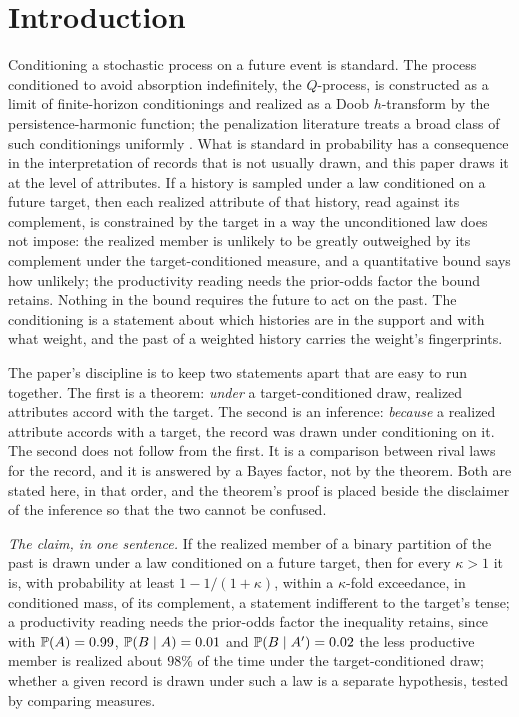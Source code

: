 \section{Introduction}\label{sec:intro}

Conditioning a stochastic process on a future event is standard. The
process conditioned to avoid absorption indefinitely, the $Q$-process, is
constructed as a limit of finite-horizon conditionings and realized as a
Doob $h$-transform by the persistence-harmonic function; the penalization
literature treats a broad class of such conditionings uniformly
\cite{RVY06,MV12,CV16}. What is standard in probability has a
consequence in the interpretation of records that is not usually drawn,
and this paper draws it at the level of attributes. If a history is
sampled under a law conditioned on a future target, then each realized
attribute of that history, read against its complement, is constrained by
the target in a way the unconditioned law does not impose: the realized member is unlikely to be greatly outweighed by its complement under the target-conditioned measure, and a quantitative bound says how unlikely; the productivity reading needs the prior-odds factor the bound retains. Nothing in the bound requires the
future to act on the past. The conditioning is a statement about which
histories are in the support and with what weight, and the past of a
weighted history carries the weight's fingerprints.

The paper's discipline is to keep two statements apart that are easy to
run together. The first is a theorem: \emph{under} a target-conditioned
draw, realized attributes accord with the target. The second is an
inference: \emph{because} a realized attribute accords with a target, the
record was drawn under conditioning on it. The second does not follow
from the first. It is a comparison between rival laws for the record, and
it is answered by a Bayes factor, not by the theorem. Both are stated
here, in that order, and the theorem's proof is placed beside the
disclaimer of the inference so that the two cannot be confused.

\emph{The claim, in one sentence.} If the realized member of a binary
partition of the past is drawn under a law conditioned on a future
target, then for every $\kappa>1$ it is, with probability at least
$1-1/(1+\kappa)$, within a $\kappa$-fold exceedance, in conditioned mass, of its complement, a statement indifferent to the target's tense; a productivity reading needs the prior-odds factor the inequality retains, since with $\mathbb{P}(A) = 0.99$, $\mathbb{P}(B \mid A) = 0.01$ and $\mathbb{P}(B \mid A') = 0.02$ the less productive member is realized about $98\%$ of the time under the target-conditioned draw;
whether a given record is drawn under such a law is a separate hypothesis,
tested by comparing measures.

